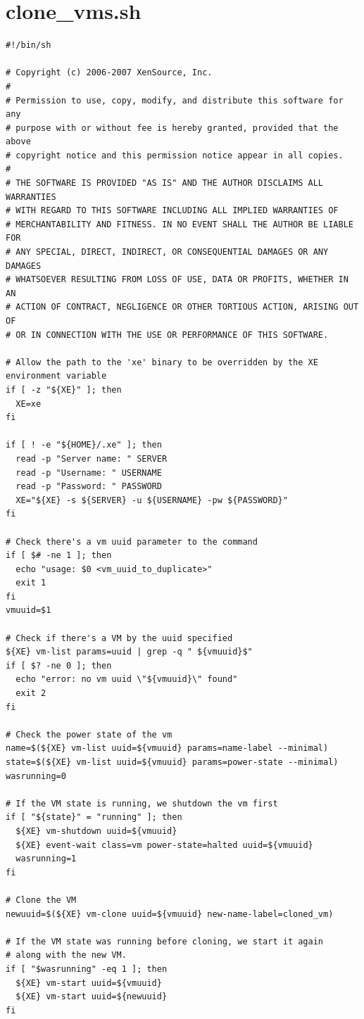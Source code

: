 \documentclass[12pt,english,oneside]{book}
\begin{document}
\chapter{clone\_vms.sh}
\label{app:clonevms}
\lstset{language=c,frame=lines}
\begin{lstlisting}
#!/bin/sh

# Copyright (c) 2006-2007 XenSource, Inc.
#
# Permission to use, copy, modify, and distribute this software for any
# purpose with or without fee is hereby granted, provided that the above
# copyright notice and this permission notice appear in all copies.
#
# THE SOFTWARE IS PROVIDED "AS IS" AND THE AUTHOR DISCLAIMS ALL WARRANTIES
# WITH REGARD TO THIS SOFTWARE INCLUDING ALL IMPLIED WARRANTIES OF
# MERCHANTABILITY AND FITNESS. IN NO EVENT SHALL THE AUTHOR BE LIABLE FOR
# ANY SPECIAL, DIRECT, INDIRECT, OR CONSEQUENTIAL DAMAGES OR ANY DAMAGES
# WHATSOEVER RESULTING FROM LOSS OF USE, DATA OR PROFITS, WHETHER IN AN
# ACTION OF CONTRACT, NEGLIGENCE OR OTHER TORTIOUS ACTION, ARISING OUT OF
# OR IN CONNECTION WITH THE USE OR PERFORMANCE OF THIS SOFTWARE.

# Allow the path to the 'xe' binary to be overridden by the XE environment variable
if [ -z "${XE}" ]; then
  XE=xe
fi

if [ ! -e "${HOME}/.xe" ]; then
  read -p "Server name: " SERVER
  read -p "Username: " USERNAME
  read -p "Password: " PASSWORD
  XE="${XE} -s ${SERVER} -u ${USERNAME} -pw ${PASSWORD}"
fi

# Check there's a vm uuid parameter to the command
if [ $# -ne 1 ]; then
  echo "usage: $0 <vm_uuid_to_duplicate>"
  exit 1
fi
vmuuid=$1

# Check if there's a VM by the uuid specified
${XE} vm-list params=uuid | grep -q " ${vmuuid}$"
if [ $? -ne 0 ]; then
  echo "error: no vm uuid \"${vmuuid}\" found"
  exit 2
fi

# Check the power state of the vm
name=$(${XE} vm-list uuid=${vmuuid} params=name-label --minimal)
state=$(${XE} vm-list uuid=${vmuuid} params=power-state --minimal)
wasrunning=0

# If the VM state is running, we shutdown the vm first
if [ "${state}" = "running" ]; then
  ${XE} vm-shutdown uuid=${vmuuid}
  ${XE} event-wait class=vm power-state=halted uuid=${vmuuid}
  wasrunning=1
fi

# Clone the VM
newuuid=$(${XE} vm-clone uuid=${vmuuid} new-name-label=cloned_vm)

# If the VM state was running before cloning, we start it again
# along with the new VM.
if [ "$wasrunning" -eq 1 ]; then
  ${XE} vm-start uuid=${vmuuid}
  ${XE} vm-start uuid=${newuuid}
fi
\end{lstlisting}
\end{document}
